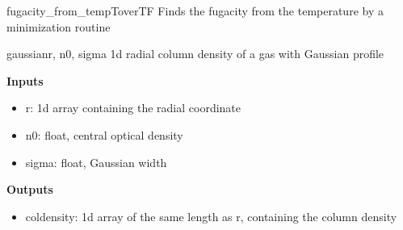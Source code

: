 \documentclass[letterpaper,10pt,english]{manual}
\begin{document}
\hypertarget{fitfuncs.fugacity_from_temp}{}\begin{funcdesc}{fugacity\_from\_temp}{ToverTF}
Finds the fugacity from the temperature by a minimization routine
\end{funcdesc}

\hypertarget{fitfuncs.gaussian}{}\begin{funcdesc}{gaussian}{r, n0, sigma}
1d radial column density of a gas with Gaussian profile

\textbf{Inputs}
\begin{itemize}
\item {} 
r: 1d array containing the radial coordinate

\item {} 
n0: float, central optical density

\item {} 
sigma: float, Gaussian width

\end{itemize}

\textbf{Outputs}
\begin{itemize}
\item {} 
coldensity: 1d array of the same length as r, containing the column density

\end{itemize}
\end{funcdesc}
\end{document}
